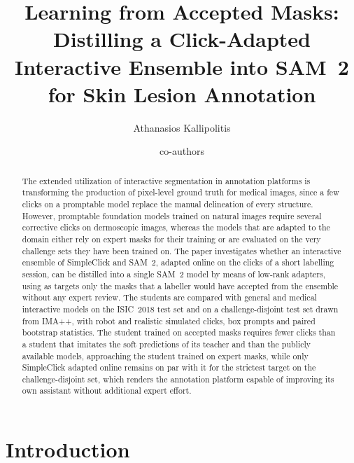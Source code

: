 \documentclass[runningheads]{llncs}
\newcommand{\tbd}[1]{#1}
\newcommand{\tbd}[1]{\textcolor{red}{[#1]}}
\begin{document}
\title{Learning from Accepted Masks: Distilling a Click-Adapted Interactive Ensemble into SAM~2 for Skin Lesion Annotation}

\author{Athanasios Kallipolitis \and \tbd{co-authors}}
\institute{\tbd{affiliation} \\ \email{\tbd{email}}}

\maketitle

\begin{abstract}
The extended utilization of interactive segmentation in annotation platforms is transforming the production of pixel-level ground truth for medical images, since a few clicks on a promptable model replace the manual delineation of every structure. However, promptable foundation models trained on natural images require several corrective clicks on dermoscopic images, whereas the models that are adapted to the domain either rely on expert masks for their training or are evaluated on the very challenge sets they have been trained on. The paper investigates whether an interactive ensemble of SimpleClick and SAM~2, adapted online on the clicks of a short labelling session, can be distilled into a single SAM~2 model by means of low-rank adapters, using as targets only the masks that a labeller would have accepted from the ensemble without any expert review. The students are compared with general and medical interactive models on the ISIC~2018 test set and on a challenge-disjoint test set drawn from IMA++, with robot and realistic simulated clicks, box prompts and paired bootstrap statistics. The student trained on accepted masks requires fewer clicks than a student that imitates the soft predictions of its teacher and than the publicly available models, approaching the student trained on expert masks, while only SimpleClick adapted online remains on par with it for the strictest target on the challenge-disjoint set, which renders the annotation platform capable of improving its own assistant without additional expert effort.
\end{abstract}

\section{Introduction}
\end{document}
